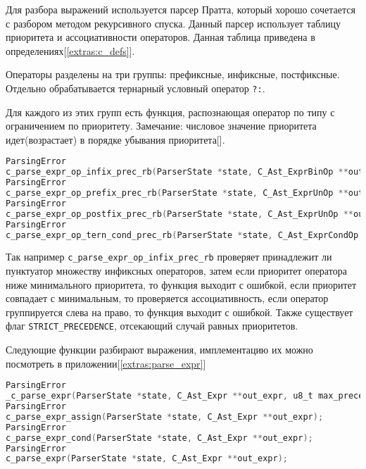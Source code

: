 

Для разбора выражений используется парсер Пратта, который хорошо сочетается с разбором методом рекурсивного спуска.
Данный парсер использует таблицу приоритета и ассоциативности операторов. Данная таблица приведена в определениях[\ref{extras:c_defs}].

Операторы разделены на три группы: префиксные, инфиксные, постфиксные.
Отдельно обрабатывается тернарный условный оператор \verb|?:|.

Для каждого из этих групп есть функция, распознающая оператор по типу с ограничением по приоритету.
Замечание: числовое значение приоритета идет(возрастает) в порядке убывания приоритета[\cite{cppref_op_prec}].

\begin{lstlisting}[language=c]
ParsingError
c_parse_expr_op_infix_prec_rb(ParserState *state, C_Ast_ExprBinOp **out_binop, u8_t max_precedence, bool is_strict_precedence);
ParsingError
c_parse_expr_op_prefix_prec_rb(ParserState *state, C_Ast_ExprUnOp **out_unop, u8_t max_precedence, bool is_strict_precedence);
ParsingError
c_parse_expr_op_postfix_prec_rb(ParserState *state, C_Ast_ExprUnOp **out_unop, u8_t max_precedence);
ParsingError
c_parse_expr_op_tern_cond_prec_rb(ParserState *state, C_Ast_ExprCondOp **out_tern, u8_t max_precedence, bool is_strict_precedence);
\end{lstlisting}

Так например \verb|c_parse_expr_op_infix_prec_rb| проверяет принадлежит ли пунктуатор множеству инфиксных операторов,
затем если приоритет оператора ниже минимального приоритета, то функция выходит с ошибкой, 
если приоритет совпадает с минимальным, то проверяется ассоциативность, если оператор группируется слева на право, то функция выходит с ошибкой.
Также существует флаг \verb|STRICT_PRECEDENCE|, отсекающий случай равных приоритетов.

Следующие функции разбирают выражения, имплементацию их можно посмотреть в приложении[\ref{extras:parse_expr}]

\begin{lstlisting}[language=c]
ParsingError
_c_parse_expr(ParserState *state, C_Ast_Expr **out_expr, u8_t max_precedence, C_ExprFlags flags);
ParsingError
c_parse_expr_assign(ParserState *state, C_Ast_Expr **out_expr);
ParsingError
c_parse_expr_cond(ParserState *state, C_Ast_Expr **out_expr);
ParsingError
c_parse_expr(ParserState *state, C_Ast_Expr **out_expr);
\end{lstlisting}



